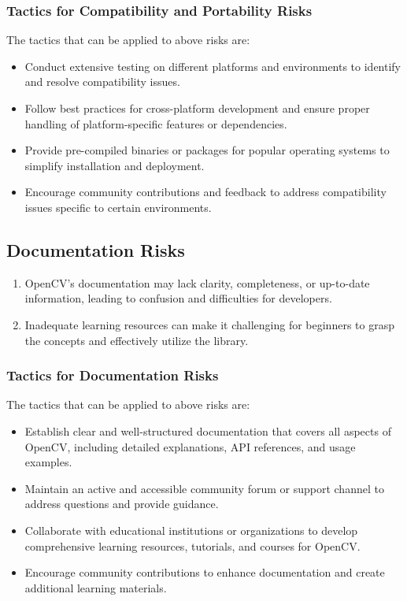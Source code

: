  \subsubsection{Tactics for Compatibility and Portability Risks \label{subsubSection::CompatibilityTactic}}
The tactics that can be applied to above risks are:
\begin{itemize}
     \item Conduct extensive testing on different platforms and environments to identify and resolve compatibility issues.
     \item Follow best practices for cross-platform development and ensure proper handling of platform-specific features or dependencies.
     \item Provide pre-compiled binaries or packages for popular operating systems to simplify installation and deployment.
     \item Encourage community contributions and feedback to address compatibility issues specific to certain environments.
\end{itemize}

\subsection{Documentation Risks \label{subSection::DocumentationRisk}}
\begin{enumerate}
     \item OpenCV's documentation may lack clarity, completeness, or up-to-date information, leading to confusion and difficulties for developers.
     \item Inadequate learning resources can make it challenging for beginners to grasp the concepts and effectively utilize the library. 
 \end{enumerate}

 \subsubsection{Tactics for Documentation Risks \label{subsubSection::DocumentationTactic}}
The tactics that can be applied to above risks are:
\begin{itemize}
     \item Establish clear and well-structured documentation that covers all aspects of OpenCV, including detailed explanations, API references, and usage examples.
     \item Maintain an active and accessible community forum or support channel to address questions and provide guidance.
     \item Collaborate with educational institutions or organizations to develop comprehensive learning resources, tutorials, and courses for OpenCV.
     \item Encourage community contributions to enhance documentation and create additional learning materials.
\end{itemize}
